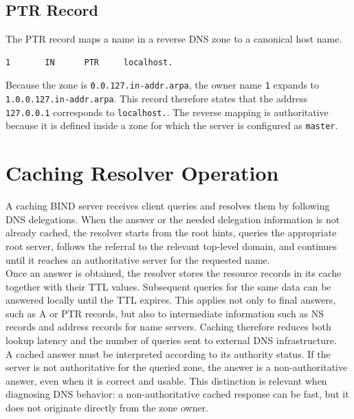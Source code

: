 \documentclass{scrbook}
\begin{document}
	\subsection{PTR Record}
	
	The PTR record maps a name in a reverse DNS zone to a canonical host name.
	
	\begin{lstlisting}
1       IN      PTR     localhost.
	\end{lstlisting}
	
	Because the zone is \texttt{0.0.127.in-addr.arpa}, the owner name \texttt{1} expands to\\
	\texttt{1.0.0.127.in-addr.arpa}. This record therefore states that the address \texttt{127.0.0.1} corresponds to \texttt{localhost.}. The reverse mapping is authoritative because it is defined inside a zone for which the server is configured as \texttt{master}.
	
	\section{Caching Resolver Operation}
	
	A caching BIND server receives client queries and resolves them by following DNS delegations. When the answer or the needed delegation information is not already cached, the resolver starts from the root hints, queries the appropriate root server, follows the referral to the relevant top-level domain, and continues until it reaches an authoritative server for the requested name.\\
	
	Once an answer is obtained, the resolver stores the resource records in its cache together with their TTL values. Subsequent queries for the same data can be answered locally until the TTL expires. This applies not only to final answers, such as A or PTR records, but also to intermediate information such as NS records and address records for name servers. Caching therefore reduces both lookup latency and the number of queries sent to external DNS infrastructure.\\
	
	A cached answer must be interpreted according to its authority status. If the server is not authoritative for the queried zone, the answer is a non-authoritative answer, even when it is correct and usable. This distinction is relevant when diagnosing DNS behavior: a non-authoritative cached response can be fast, but it does not originate directly from the zone owner.
	
\end{document}
